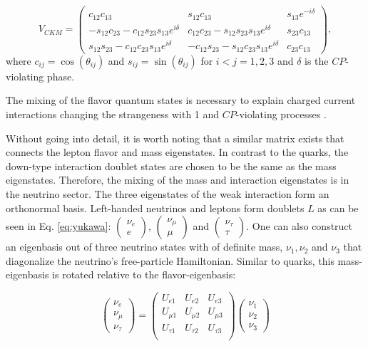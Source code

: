 \begin{equation}
V_{CKM} = \begin{pmatrix}
c_{12}c_{13} & s_{12}c_{13} & s_{13}e^{-i\delta} \\
-s_{12}c_{23} - c_{12}s_{23}s_{13} e^{i\delta} & c_{12}c_{23} - s_{12}s_{23}s_{13}e^{i\delta} & s_{23}c_{13} \\
s_{12}s_{23} - c_{12}c_{23}s_{13}e^{i\delta} 
& -c_{12}s_{23} - s_{12}c_{23}s_{13}e^{i\delta} & c_{23}c_{13}
\end{pmatrix},
\end{equation}
where $c_{ij} = \cos\left(\theta_{ij}\right)$ and  $s_{ij} = \sin\left(\theta_{ij}\right)$ for $i<j = 1,2,3$ and $\delta$ is the $CP$-violating phase.

The mixing of the flavor quantum states is necessary to explain charged current interactions changing the strangeness with 1 \cite{Glashow:1970gm} and $CP$-violating processes \cite{1964PhRvL}.

Without going into detail, it is worth noting that a similar matrix exists that connects the lepton flavor and mass eigenstates. In contrast to the quarks, the down-type interaction doublet states are chosen to be the same as the mass eigenstates. Therefore, the mixing of the mass and interaction eigenstates is in the neutrino sector. The three eigenstates of the weak interaction form an orthonormal basis. Left-handed neutrinos and leptons form doublets $L$ as can be seen in Eq. \ref{eq:yukawa}: $\begin{pmatrix}\nu_e \\ e \end{pmatrix}$, $\begin{pmatrix}\nu_\mu \\ \mu \end{pmatrix}$ and $\begin{pmatrix}\nu_\tau \\ \tau \end{pmatrix}$. One can also construct an eigenbasis out of three neutrino states with of definite mass, $\nu_1, \nu_2$ and $\nu_3$ that diagonalize the neutrino's free-particle Hamiltonian. Similar to quarks, this mass-eigenbasis is rotated relative to the flavor-eigenbasis:

\begin{equation}
\begin{pmatrix}
\nu_e \\ \nu_\mu \\ \nu_\tau
\end{pmatrix}
=
\begin{pmatrix}
U_{e1} & U_{e2} & U_{e3} \\
U_{\mu 1} & U_{\mu 2} & U_{\mu 3} \\
U_{\tau 1} & U_{\tau 2} & U_{\tau 3} \\
\end{pmatrix}
\begin{pmatrix}
\nu_1 \\ \nu_2 \\ \nu_3
\end{pmatrix}
\end{equation}

